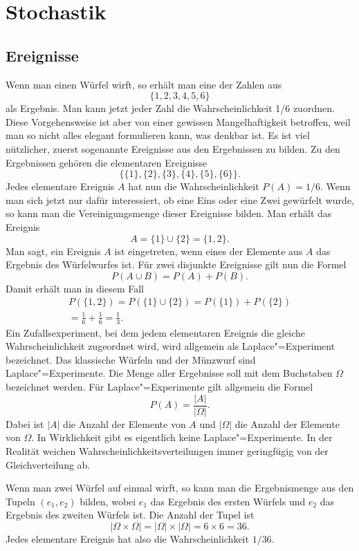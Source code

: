 \documentclass[a4paper,10pt,fleqn,twocolumn,twoside]{article}
\begin{document}
\newpage
\section{Stochastik}
\subsection{Ereignisse}

Wenn man einen Würfel wirft, so erhält man eine der Zahlen aus
\[\{1,2,3,4,5,6\}\]
als Ergebnis. Man kann jetzt jeder Zahl die Wahrscheinlichkeit 1/6
zuordnen. Diese Vorgehensweise ist aber von einer gewissen
Mangelhaftigkeit betroffen, weil man so nicht alles elegant
formulieren kann, was denkbar ist. Es ist viel nützlicher, zuerst
sogenannte Ereignisse aus den Ergebnissen zu bilden. Zu den
Ergebnissen gehören die elementaren Ereignisse
\[\{\{1\},\{2\},\{3\},\{4\},\{5\},\{6\}\}.\]
Jedes elementare Ereignis $A$ hat nun die Wahrscheinlichkeit
$P(A)=1/6$. Wenn man sich jetzt nur dafür interessiert, ob eine
Eins oder eine Zwei gewürfelt wurde, so kann man die Vereinigungsmenge
dieser Ereignisse bilden. Man erhält das Ereignis
\[A = \{1\}\cup\{2\} = \{1,2\}.\]
Man sagt, ein Ereignis $A$ ist eingetreten, wenn eines der Elemente
aus $A$ das Ergebnis des Würfelwurfes ist. Für zwei disjunkte
Ereignisse gilt nun die Formel
\[P(A\cup B) = P(A)+P(B).\]
Damit erhält man in diesem Fall
\begin{gather*}
P(\{1,2\})=P(\{1\}\cup\{2\})=P(\{1\})+P(\{2\})\\
= \frac{1}{6}+\frac{1}{6} = \frac{1}{3}.
\end{gather*}
Ein Zufallsexperiment, bei dem jedem elementaren Ereignis die
gleiche Wahrscheinlichkeit zugeordnet wird, wird allgemein als
Laplace"=Experiment bezeichnet. Das klassische Würfeln und der
Münzwurf sind Laplace"=Experimente. Die Menge aller Ergebnisse
soll mit dem Buchstaben $\Omega$ bezeichnet werden.
Für Laplace"=Experimente gilt allgemein die Formel
\[P(A) = \frac{|A|}{|\Omega|}.\]
Dabei ist $|A|$ die Anzahl der Elemente von $A$ und $|\Omega|$
die Anzahl der Elemente von $\Omega$. In Wirklichkeit gibt es
eigentlich keine Laplace"=Experimente. In der Realität weichen
Wahrscheinlichkeitsverteilungen immer geringfügig von der
Gleichverteilung ab.

Wenn man zwei Würfel auf einmal wirft, so kann man die Ergebnismenge
aus den Tupeln $(e_1,e_2)$ bilden, wobei $e_1$ das Ergebnis des
ersten Würfels und $e_2$ das Ergebnis des zweiten Würfels ist.
Die Anzahl der Tupel ist
\[|\Omega\times\Omega| = |\Omega|\times|\Omega| = 6\times 6 = 36.\]
Jedes elementare Ereignis hat also die Wahrscheinlichkeit $1/36$.
\end{document}
